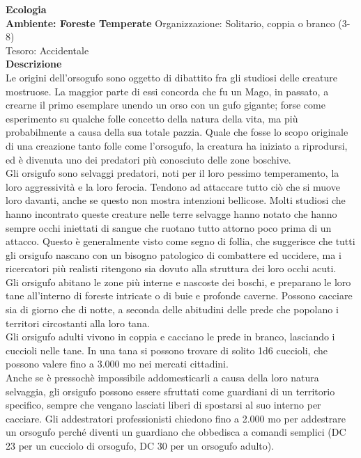 \begin{multicols}{2}
\textbf{Ecologia}\\
\textbf{Ambiente: Foreste Temperate}
Organizzazione: Solitario, coppia o branco (3-8)\\
Tesoro: Accidentale\\
\textbf{Descrizione}\\
Le origini dell'orsogufo sono oggetto di dibattito fra gli studiosi delle creature mostruose. La maggior parte di essi concorda che fu un Mago, in passato, a crearne il primo esemplare unendo un orso con un gufo gigante; forse come esperimento su qualche folle concetto della natura della vita, ma più probabilmente a causa della sua totale pazzia. Quale che fosse lo scopo originale di una creazione tanto folle come l'orsogufo, la creatura ha iniziato a riprodursi, ed è divenuta uno dei predatori più conosciuto delle zone boschive.\\
Gli orsigufo sono selvaggi predatori, noti per il loro pessimo temperamento, la loro aggressività e la loro ferocia. Tendono ad attaccare tutto ciò che si muove loro davanti, anche se questo non mostra intenzioni bellicose. Molti studiosi che hanno incontrato queste creature nelle terre selvagge hanno notato che hanno sempre occhi iniettati di sangue che ruotano tutto attorno poco prima di un attacco. Questo è generalmente visto come segno di follia, che suggerisce che tutti gli orsigufo nascano con un bisogno patologico di combattere ed uccidere, ma i ricercatori più realisti ritengono sia dovuto alla struttura dei loro occhi acuti.\\
Gli orsigufo abitano le zone più interne e nascoste dei boschi, e preparano le loro tane all'interno di foreste intricate o di buie e profonde caverne. Possono cacciare sia di giorno che di notte, a seconda delle abitudini delle prede che popolano i territori circostanti alla loro tana.\\
Gli orsigufo adulti vivono in coppia e cacciano le prede in branco, lasciando i cuccioli nelle tane. In una tana si possono trovare di solito 1d6 cuccioli, che possono valere fino a 3.000 mo nei mercati cittadini.\\

Anche se è pressochè impossibile addomesticarli a causa della loro natura selvaggia, gli orsigufo possono essere sfruttati come guardiani di un territorio specifico, sempre che vengano lasciati liberi di spostarsi al suo interno per cacciare. Gli addestratori professionisti chiedono fino a 2.000 mo per addestrare un orsogufo perché diventi un guardiano che obbedisca a comandi semplici (DC 23 per un cucciolo di orsogufo, DC 30 per un orsogufo adulto).\\



\end{multicols}
